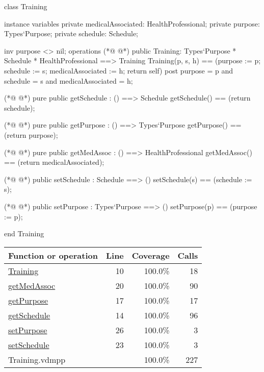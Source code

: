 \begin{vdmpp}[breaklines=true]
class Training
 
instance variables
 private medicalAssociated: HealthProfessional;
 private purpose: Types`Purpose;
 private schedule: Schedule;

 inv purpose <> nil;
operations
(*@
\label{Training:10}
@*)
 public Training: Types`Purpose * Schedule * HealthProfessional ==> Training
   Training(p, s, h) == (purpose := p; schedule := s; medicalAssociated := h; return self)
 post purpose = p and schedule = s and medicalAssociated = h;

(*@
\label{getSchedule:14}
@*)
 pure public getSchedule : () ==> Schedule
   getSchedule() == (return schedule);
 
(*@
\label{getPurpose:17}
@*)
  pure public getPurpose : () ==> Types`Purpose
  getPurpose() == (return purpose); 
 
(*@
\label{getMedAssoc:20}
@*)
 pure public getMedAssoc : () ==> HealthProfessional
  getMedAssoc() == (return medicalAssociated); 

(*@
\label{setSchedule:23}
@*)
 public setSchedule : Schedule ==> ()
   setSchedule(s) == (schedule := s);
 
(*@
\label{setPurpose:26}
@*)
 public setPurpose : Types`Purpose ==> ()
   setPurpose(p) == (purpose := p);
 
 end Training
\end{vdmpp}
\bigskip
\begin{longtable}{|l|r|r|r|}
\hline
Function or operation & Line & Coverage & Calls \\
\hline
\hline
\hyperref[Training:10]{Training} & 10&100.0\% & 18 \\
\hline
\hyperref[getMedAssoc:20]{getMedAssoc} & 20&100.0\% & 90 \\
\hline
\hyperref[getPurpose:17]{getPurpose} & 17&100.0\% & 17 \\
\hline
\hyperref[getSchedule:14]{getSchedule} & 14&100.0\% & 96 \\
\hline
\hyperref[setPurpose:26]{setPurpose} & 26&100.0\% & 3 \\
\hline
\hyperref[setSchedule:23]{setSchedule} & 23&100.0\% & 3 \\
\hline
\hline
Training.vdmpp & & 100.0\% & 227 \\
\hline
\end{longtable}

